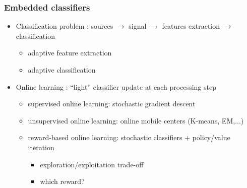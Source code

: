 \documentclass{beamer}
\begin{document}
\begin{frame}\frametitle{Embedded classifiers}
	\vspace{-1cm}
	\begin{itemize}
		\item Classification problem : sources $\rightarrow$ signal $\rightarrow$ features extraction $\rightarrow$ classification
		\begin{itemize}
			\item adaptive feature extraction
			\item adaptive classification
		\end{itemize}
		\item Online learning : ``light'' classifier update at each processing step
		\begin{itemize}
			\item supervised online learning: stochastic gradient descent
			\item unsupervised online learning: online mobile centers (K-means, EM,...) 
			\item reward-based online learning: stochastic classifiers + policy/value iteration 
			\begin{itemize}
				\item exploration/exploitation trade-off
				\item which reward?
			\end{itemize}
		\end{itemize}
	\end{itemize}
\end{frame}
\end{document}
